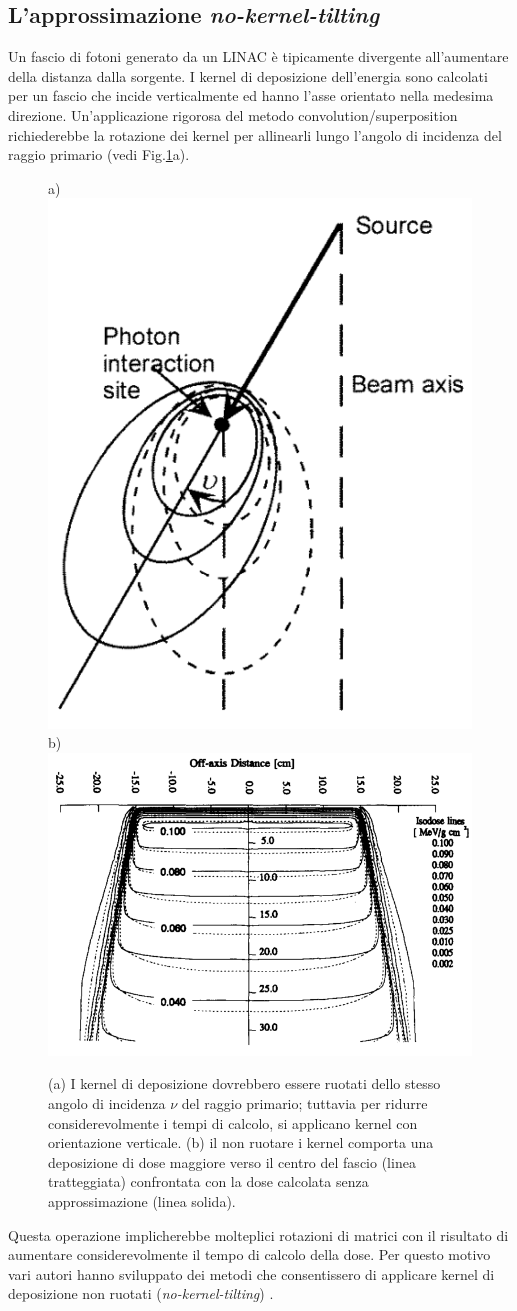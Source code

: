 {\subsection{L'approssimazione \textit{no-kernel-tilting}}
Un fascio di fotoni generato da un LINAC è tipicamente divergente all'aumentare della distanza dalla sorgente. I kernel di deposizione dell'energia sono calcolati per un fascio che incide verticalmente ed hanno l'asse orientato nella medesima direzione. Un'applicazione rigorosa del metodo convolution/superposition richiederebbe la rotazione dei kernel per allinearli lungo l'angolo di incidenza del raggio primario (vedi Fig.\ref{fig:kern_tilt}a).\\
\begin{figure}
\centering
a)\includegraphics[width=.3\textwidth]{./cap1/kern_tilt.png}
b)\includegraphics[width=.55\textwidth]{./cap1/kern_tilt_b.png}
\caption{(a) I kernel di deposizione dovrebbero essere ruotati dello stesso angolo di incidenza $\nu$ del raggio primario; tuttavia per ridurre considerevolmente i tempi di calcolo, si applicano kernel con orientazione verticale. (b) il non ruotare i kernel comporta una deposizione di dose maggiore verso il centro del fascio (linea tratteggiata) confrontata con la dose calcolata senza approssimazione (linea solida).}
\label{fig:kern_tilt}
\end{figure}
Questa operazione implicherebbe molteplici rotazioni di matrici \cite{Sharpe1997} con il risultato di aumentare considerevolmente il tempo di calcolo della dose. 
Per questo motivo vari autori hanno sviluppato dei metodi che consentissero di applicare kernel di deposizione non ruotati (\textit{no-kernel-tilting}) \cite{Sharpe1997,Papanikolaou1993}.

}
